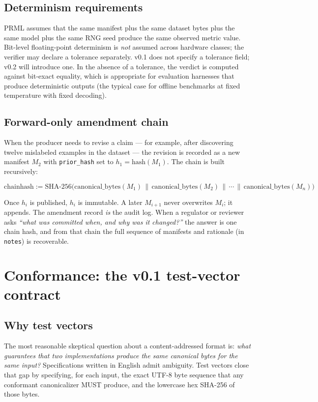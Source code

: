 \documentclass[11pt, a4paper]{article}
\begin{document}
\subsection{Determinism requirements}

PRML assumes that the same manifest plus the same dataset bytes plus the same model plus the same RNG seed produce the same observed metric value. Bit-level floating-point determinism is \emph{not} assumed across hardware classes; the verifier may declare a tolerance separately. v0.1 does not specify a tolerance field; v0.2 will introduce one. In the absence of a tolerance, the verdict is computed against bit-exact equality, which is appropriate for evaluation harnesses that produce deterministic outputs (the typical case for offline benchmarks at fixed temperature with fixed decoding).

\subsection{Forward-only amendment chain}

When the producer needs to revise a claim --- for example, after discovering twelve mislabeled examples in the dataset --- the revision is recorded as a new manifest $M_2$ with \texttt{prior\_hash} set to $h_1 = \mathrm{hash}(M_1)$. The chain is built recursively:

\[
\mathrm{chainhash} := \mathrm{SHA\text{-}256}\big( \mathrm{canonical\_bytes}(M_1) \,\|\, \mathrm{canonical\_bytes}(M_2) \,\|\, \cdots \,\|\, \mathrm{canonical\_bytes}(M_n) \big)
\]

Once $h_i$ is published, $h_i$ is immutable. A later $M_{i+1}$ never overwrites $M_i$; it appends. The amendment record \emph{is} the audit log. When a regulator or reviewer asks \emph{``what was committed when, and why was it changed?''} the answer is one chain hash, and from that chain the full sequence of manifests and rationale (in \texttt{notes}) is recoverable.

\section{Conformance: the v0.1 test-vector contract}
\label{sec:conformance}

\subsection{Why test vectors}

The most reasonable skeptical question about a content-addressed format is: \emph{what guarantees that two implementations produce the same canonical bytes for the same input?} Specifications written in English admit ambiguity. Test vectors close that gap by specifying, for each input, the exact UTF-8 byte sequence that any conformant canonicalizer MUST produce, and the lowercase hex SHA-256 of those bytes.
\end{document}
